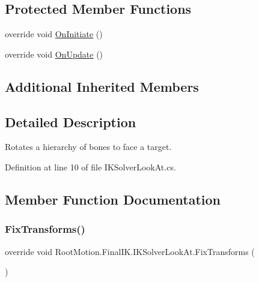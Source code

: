 \subsection*{Protected Member Functions}
\begin{DoxyCompactItemize}
\item 
override void \mbox{\hyperlink{class_root_motion_1_1_final_i_k_1_1_i_k_solver_look_at_a903b4b46d1636ca48916c268d91a50d3}{On\+Initiate}} ()
\item 
override void \mbox{\hyperlink{class_root_motion_1_1_final_i_k_1_1_i_k_solver_look_at_a3ebd64abafa199027645f3b68a405ea5}{On\+Update}} ()
\end{DoxyCompactItemize}
\subsection*{Additional Inherited Members}


\subsection{Detailed Description}
Rotates a hierarchy of bones to face a target. 



Definition at line 10 of file I\+K\+Solver\+Look\+At.\+cs.



\subsection{Member Function Documentation}
\mbox{\label{class_root_motion_1_1_final_i_k_1_1_i_k_solver_look_at_afc01280e8f1020cd817748b235f384c4}} 
\subsubsection{\texorpdfstring{Fix\+Transforms()}{FixTransforms()}}
{\footnotesize\ttfamily override void Root\+Motion.\+Final\+I\+K.\+I\+K\+Solver\+Look\+At.\+Fix\+Transforms (\begin{DoxyParamCaption}{ }\end{DoxyParamCaption})\hspace{0.3cm}{\ttfamily [virtual]}}



